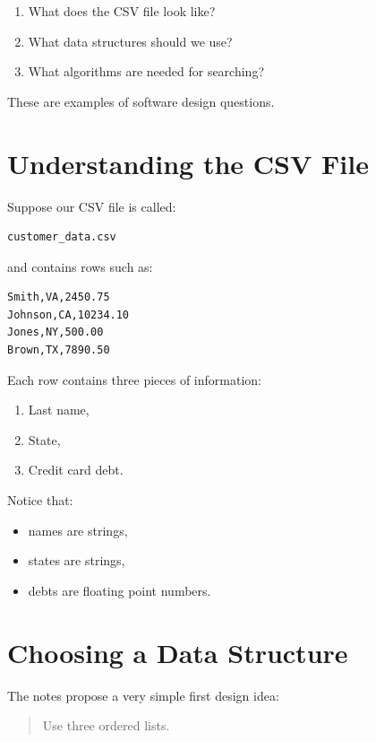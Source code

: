 \documentclass[11pt]{article}
\begin{document}
\begin{enumerate}
    \item What does the CSV file look like?
    \item What data structures should we use?
    \item What algorithms are needed for searching?
\end{enumerate}

These are examples of software design questions.

\section{Understanding the CSV File}

Suppose our CSV file is called:

\begin{lstlisting}
customer_data.csv
\end{lstlisting}

and contains rows such as:

\begin{lstlisting}
Smith,VA,2450.75
Johnson,CA,10234.10
Jones,NY,500.00
Brown,TX,7890.50
\end{lstlisting}

Each row contains three pieces of information:

\begin{enumerate}
    \item Last name,
    \item State,
    \item Credit card debt.
\end{enumerate}

Notice that:

\begin{itemize}
    \item names are strings,
    \item states are strings,
    \item debts are floating point numbers.
\end{itemize}

\section{Choosing a Data Structure}

The notes propose a very simple first design idea:

\begin{quote}
Use three ordered lists.
\end{quote}
\end{document}
